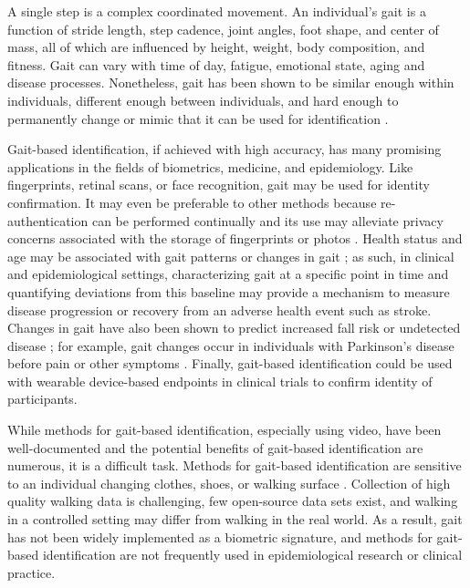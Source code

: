 A single step is a complex coordinated movement. An individual's gait is a function of stride length, step cadence, joint angles, foot shape, and center of mass, all of which are influenced by height, weight, body composition, and fitness. Gait can vary with time of day, fatigue, emotional state, aging and disease processes. Nonetheless, gait has been shown to be similar enough within individuals, different enough between individuals, and hard enough to permanently change or mimic \cite{gafurov_spoof_2007} that it can be used for identification \cite{connor_biometric_2018}.


Gait-based identification, if achieved with high accuracy, has many promising applications in the fields of biometrics, medicine, and epidemiology. Like fingerprints, retinal scans, or face recognition, gait may be used for identity confirmation. It may even be preferable to other methods because re-authentication can be performed continually and its use may alleviate  privacy concerns associated with the storage of fingerprints or photos \cite{vildjiounaite_unobtrusive_2006}. Health status and age may be associated with gait patterns or changes in gait \cite{cohen_gait_2019, samson_differences_2001}; as such, in clinical and epidemiological settings, characterizing gait at a specific point in time and quantifying deviations from this baseline may provide a mechanism to measure disease progression or recovery from an adverse health event such as stroke. Changes in gait have also been shown to predict increased fall risk \cite{maki_gait_1997} or undetected disease \cite{hausdorff_gait_2009}; for example, gait changes occur in individuals with Parkinson's disease before pain or other symptoms \cite{Mirelman2019}. Finally, gait-based identification could be used with wearable device-based endpoints in clinical trials to confirm identity of participants.

 
While methods for gait-based identification, especially using video, have been well-documented \cite{Chellappa2009} and the potential benefits of gait-based identification are numerous, it is a difficult task. Methods for gait-based identification are sensitive to an individual changing clothes, shoes, or walking surface \cite{sarkar_humanid_2005}. Collection of high quality walking data is challenging, few open-source data sets exist, and walking in a controlled setting may differ from walking in the real world. As a result, gait has not been widely implemented as a biometric signature, and methods for gait-based identification are not frequently used in epidemiological research or clinical practice. 


